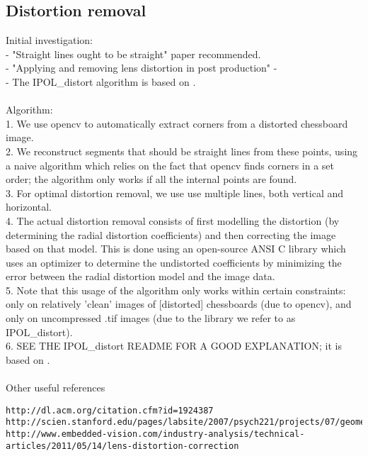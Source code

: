 \subsection{Distortion removal}
Initial investigation:\\
- "Straight lines ought to be straight" paper recommended.\\
- "Applying and removing lens distortion in post production" - \cite{postproduction} \\
- The IPOL_distort algorithm is based on \cite{algebraic-distortion}.\\\\
Algorithm:\\
1. We use opencv to automatically extract corners from a distorted chessboard image.\\
2. We reconstruct segments that should be straight lines from these points, using a naive algorithm which relies on the fact that opencv finds corners in a set order; the algorithm only works if all the internal points are found.\\
3. For optimal distortion removal, we use use multiple lines, both vertical and horizontal.\\
4. The actual distortion removal consists of first modelling the distortion (by determining the radial distortion coefficients) and then correcting the image based on that model. This is done using an open-source ANSI C library which uses an optimizer to determine the undistorted coefficients by minimizing the error between the radial distortion model and the image data.\\
5. Note that this usage of the algorithm only works within certain constraints: only on relatively 'clean' images of [distorted] chessboards (due to opencv), and only on uncompressed .tif images (due to the library we refer to as IPOL_distort).\\
6. SEE THE IPOL_distort README FOR A GOOD EXPLANATION; it is based on \cite{algebraic-distortion}.\\\\
Other useful references\\
\begin{verbatim}
http://dl.acm.org/citation.cfm?id=1924387
http://scien.stanford.edu/pages/labsite/2007/psych221/projects/07/geometric_distortion/project.htm
http://www.embedded-vision.com/industry-analysis/technical-articles/2011/05/14/lens-distortion-correction
\end{verbatim}
